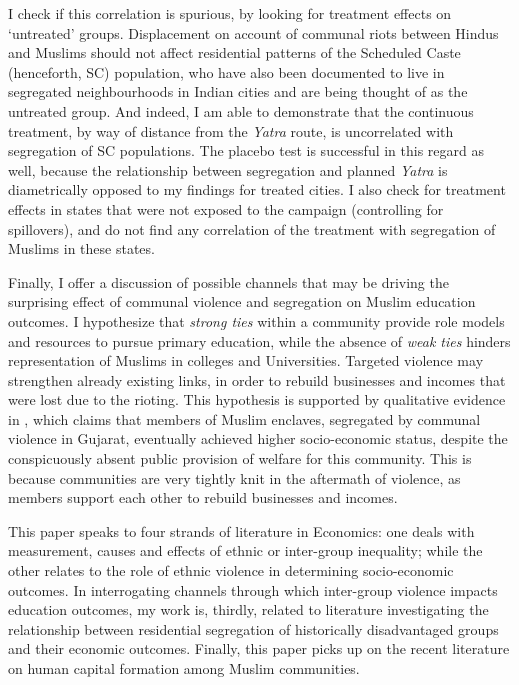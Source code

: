 \documentclass{article}
\begin{document}
I check if this correlation is spurious, by looking for treatment effects on `untreated' groups. Displacement on account of communal riots between Hindus and Muslims should not affect residential patterns of the Scheduled Caste (henceforth, SC) population, who have also been documented to live in segregated neighbourhoods in Indian cities \citep{bharathi2018isolated} and are being thought of as the untreated group. And indeed, I am able to demonstrate that the continuous treatment, by way of distance from the \textit{Yatra} route, is uncorrelated with segregation of SC populations. The placebo test is successful in this regard as well, because the relationship between segregation and planned \textit{Yatra} is diametrically opposed to my findings for treated cities. I also check for treatment effects in states that were not exposed to the campaign (controlling for spillovers), and do not find any correlation of the treatment with segregation of Muslims in these states.  

Finally, I offer a discussion of possible channels that may be driving the surprising effect of communal violence and segregation on Muslim education outcomes. I hypothesize that \textit{strong ties} \citep{granovetter1973strength} within a community provide role models and resources to pursue primary education, while the absence of \textit{weak ties} hinders representation of Muslims in colleges and Universities. Targeted violence may strengthen already existing links, in order to rebuild businesses and incomes that were lost due to the rioting. This  hypothesis  is  supported by qualitative evidence in \cite{jaffrelot2012muslims}, which claims that members of Muslim enclaves, segregated by communal violence in Gujarat, eventually achieved higher socio-economic status, despite the conspicuously absent public provision of welfare for this community. This is because communities are very tightly knit in the aftermath of violence, as members support each other to rebuild businesses and incomes. 

This paper speaks to four strands of literature in Economics: one deals with measurement, causes and effects of ethnic or inter-group inequality; while the other relates to the role of ethnic violence in determining socio-economic outcomes. In interrogating channels through which inter-group violence impacts education outcomes, my work is, thirdly, related to literature investigating the relationship between residential segregation of historically disadvantaged groups and their economic outcomes. Finally, this paper picks up on the recent literature on human capital formation among Muslim communities.
\end{document}
